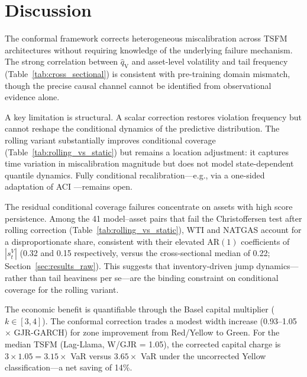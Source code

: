 \documentclass[preprint,11pt,authoryear]{elsarticle}
\newcommand{\1}{\boldsymbol{1}}
\newcommand{\qV}{\hat{q}_{\scriptscriptstyle\mathrm{V}}}
\begin{document}
	\section{Discussion}
	\label{sec:discuss}
	\label{sec:failure}
	
	The conformal framework corrects heterogeneous miscalibration
	across TSFM architectures without requiring knowledge of the
	underlying failure mechanism. The strong correlation between
	$\qV$ and asset-level volatility and tail frequency
	(Table~\ref{tab:cross_sectional}) is consistent with
	pre-training domain mismatch, though the precise causal
	channel cannot be identified from observational evidence alone.
	
	A key limitation is structural. A scalar correction restores
	violation frequency but cannot reshape the conditional
	dynamics of the predictive distribution. The rolling variant
	substantially improves conditional coverage
	(Table~\ref{tab:rolling_vs_static}) but remains a location
	adjustment: it captures time variation in miscalibration magnitude but does not model state-dependent quantile dynamics. Fully conditional recalibration---e.g., via a
	one-sided adaptation of ACI \citep{gibbs2021adaptive}---remains
	open.

	The residual conditional coverage failures concentrate on assets
	with high score persistence. Among the 41 model--asset pairs that
	fail the Christoffersen test after rolling correction
	(Table~\ref{tab:rolling_vs_static}), WTI and NATGAS account for
	a disproportionate share, consistent with their elevated
	$\mathrm{AR}(1)$ coefficients of $|s^V_t|$ (0.32 and 0.15
	respectively, versus the cross-sectional median of 0.22;
	Section~\ref{sec:results_raw}). This suggests that
	inventory-driven jump dynamics---rather than tail heaviness per
	se---are the binding constraint on conditional coverage for the
	rolling variant.

	The economic benefit is quantifiable through the Basel capital
	multiplier ($k \in [3,4]$). The conformal correction trades a
	modest width increase (0.93--1.05$\times$ GJR-GARCH) for zone
	improvement from Red/Yellow to Green. For the median TSFM
	(Lag-Llama, W/GJR = 1.05), the corrected capital charge is
	$3 \times 1.05 = 3.15\times$ VaR versus $3.65\times$ VaR
	under the uncorrected Yellow classification---a net saving
	of 14\%.
\end{document}
